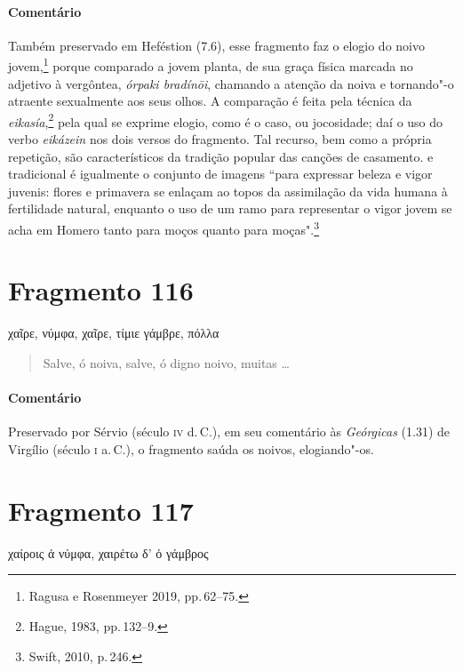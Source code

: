 \medskip

{\paragraph{Comentário} Também preservado em Heféstion (7.6), esse fragmento faz o elogio do noivo jovem,\footnote{Ragusa e Rosenmeyer 2019, pp.\,62--75.} porque comparado a jovem planta, de sua
graça física marcada no adjetivo à vergôntea, \emph{órpaki bradínōi}, chamando a atenção da noiva e tornando"-o atraente sexualmente aos seus olhos.
A comparação é feita pela técnica da \emph{eikasía},\footnote{Hague, 1983, pp.\,132--9.} pela qual se exprime elogio, como é o caso, ou jocosidade; daí o uso do verbo \emph{eikázein} nos dois versos do fragmento. Tal recurso, bem como a própria repetição, são característicos da tradição popular das canções de casamento. e tradicional é igualmente o conjunto de imagens ``para expressar beleza e vigor juvenis: flores e primavera se enlaçam ao topos da assimilação da vida humana à fertilidade natural, enquanto o uso de um ramo para representar o vigor jovem se acha em Homero tanto para moços quanto para moças".\footnote{Swift, 2010, p.\,246.}}

\section{Fragmento 116}

\begin{gkverse}
χαῖρε, νύμφα, χαῖρε, τίμιε γάμβρε, πόλλα
\end{gkverse}

\begin{verse}
Salve, ó noiva, salve, ó digno noivo, muitas \ldots{}
\end{verse}

\medskip

\paragraph{Comentário} Preservado por Sérvio (século \textsc{iv} d.\,C.), em seu comentário às \emph{Geórgicas} (1.31) de Virgílio (século \textsc{i} a.\,C.), o fragmento saúda os noivos, elogiando"-os.


\section{Fragmento 117}

\begin{gkverse}
\dagger{}χαίροις ἀ νύμφα\dagger{}, χαιρέτω δ’ ὀ γάμβρος
\end{gkverse}

